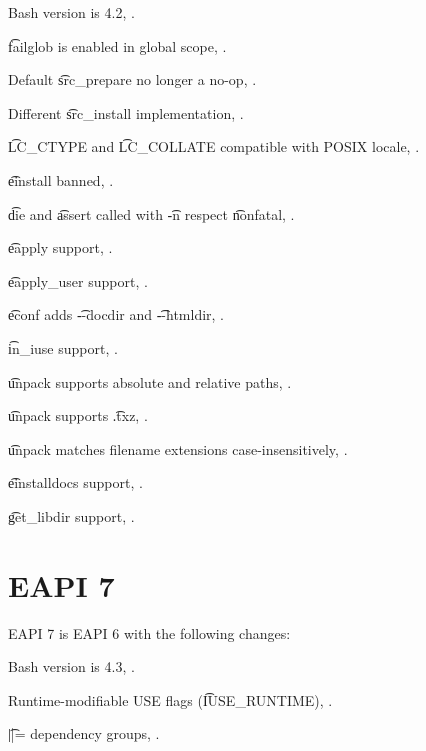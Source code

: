 \begin{compactitem}
\item Bash version is 4.2, .
\item \t{failglob} is enabled in global scope, .
\item Default \t{src_prepare} no longer a no-op, .
\item Different \t{src_install} implementation, .
\item \t{LC_CTYPE} and \t{LC_COLLATE} compatible with POSIX locale, .
\item \t{einstall} banned, .
\item \t{die} and \t{assert} called with \t{-n} respect \t{nonfatal}, .
\item \t{eapply} support, .
\item \t{eapply_user} support, .
\item \t{econf} adds \t{-{}-docdir} and \t{-{}-htmldir}, .
\item \t{in_iuse} support, .
\item \t{unpack} supports absolute and relative paths, .
\item \t{unpack} supports \t{.txz}, .
\item \t{unpack} matches filename extensions case-insensitively, .
\item \t{einstalldocs} support, .
\item \t{get_libdir} support, .
\end{compactitem}

\section{EAPI 7}

EAPI 7 is EAPI 6 with the following changes:

\begin{compactitem}
\item Bash version is 4.3, .
\item Runtime-modifiable USE flags (\t{IUSE_RUNTIME}), .
\item \t{||=} dependency groups, .
\end{compactitem}



